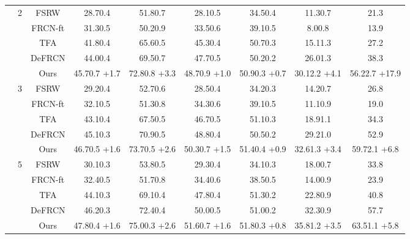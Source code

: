 \documentclass{article}
\begin{document}
\begin{table}[hbt!]
\begin{adjustbox}{width=0.79\textwidth}
{\begin{tabular}{c|c|c|ccc|c|cc}
         \cmidrule{2-9}
         &\multirow{5}{*}{2}&FSRW \cite{metayolo} & 28.70.4&51.80.7&28.10.5&34.50.4&11.30.7&21.3 \\
         &&FRCN-ft \cite{metarcnn}&31.30.5&50.20.9&33.50.6&39.10.5&8.00.8&13.9\\
         &&TFA \cite{tfa}&41.80.4&65.60.5&45.30.4&50.70.3&15.11.3&27.2\\
         &&DeFRCN \cite{defrcn}&44.00.4&69.50.7&47.70.5&50.20.2&26.01.3&38.3\\
         && \cellcolor{gray!30}Ours&\cellcolor{gray!30}45.70.7 {\scriptsize \color{red}+1.7}&\cellcolor{gray!30}72.80.8 {\scriptsize \color{red}+3.3}&\cellcolor{gray!30}48.70.9 {\scriptsize \color{red}+1.0}&\cellcolor{gray!30}50.90.3 {\scriptsize \color{red}+0.7}&\cellcolor{gray!30}30.12.2{ \scriptsize \color{red}+4.1}&\cellcolor{gray!30}56.22.7 {\scriptsize \color{red}+17.9}\\
         \cmidrule{2-9}
         &\multirow{5}{*}{3}&FSRW \cite{metayolo} &29.20.4&52.70.6&28.50.4&34.20.3&14.20.7&26.8  \\
         &&FRCN-ft \cite{metarcnn}&32.10.5&51.30.8&34.30.6&39.10.5&11.10.9&19.0\\
         &&TFA \cite{tfa}&43.10.4&67.50.5&46.70.5&51.10.3&18.91.1&34.3\\
         &&DeFRCN \cite{defrcn}&45.10.3&70.90.5&48.80.4&50.50.2&29.21.0&52.9\\
         && \cellcolor{gray!30}Ours&\cellcolor{gray!30}46.70.5 {\scriptsize \color{red}+1.6}&\cellcolor{gray!30}73.70.5 {\scriptsize \color{red}+2.6}&\cellcolor{gray!30}50.30.7 {\scriptsize \color{red}+1.5}&\cellcolor{gray!30}51.40.4 {\scriptsize \color{red}+0.9}&\cellcolor{gray!30}32.61.3 {\scriptsize \color{red}+3.4}&\cellcolor{gray!30}59.72.1 {\scriptsize \color{red}+6.8}\\
         \cmidrule{2-9}
         &\multirow{5}{*}{5}&FSRW \cite{metayolo} &30.10.3&53.80.5&29.30.4&34.10.3&18.00.7&33.8  \\
         &&FRCN-ft \cite{metarcnn}&32.40.5&51.70.8&34.40.6&38.50.5&14.00.9&23.9\\
         &&TFA \cite{tfa}&44.10.3&69.10.4&47.80.4&51.30.2&22.80.9&40.8\\
         &&DeFRCN \cite{defrcn}&46.20.3&72.40.4&50.00.5&51.00.2&32.30.9&57.7\\
         && \cellcolor{gray!30}Ours&\cellcolor{gray!30}47.80.4 {\scriptsize \color{red}+1.6}&\cellcolor{gray!30}75.00.3 {\scriptsize \color{red}+2.6}&\cellcolor{gray!30}51.60.7 {\scriptsize \color{red}+1.6}&\cellcolor{gray!30}51.80.3 {\scriptsize \color{red}+0.8}&\cellcolor{gray!30}35.81.2 {\scriptsize \color{red}+3.5}&\cellcolor{gray!30}63.51.1 {\scriptsize \color{red}+5.8}\\

\end{tabular}}
\end{adjustbox}
\end{table}
\end{document}
